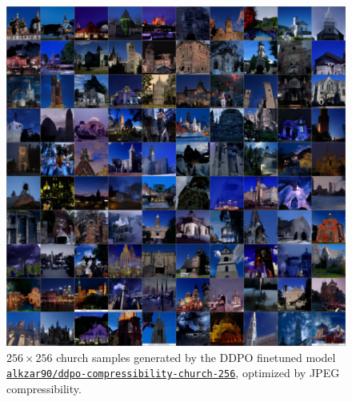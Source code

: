 \begin{appendixs}
        \begin{figure}
            \centering
            \includegraphics[scale=0.8]{img/results/ddpo-church-compressibility-samples.png}
            \vspace{-4pt}  %
            \captionsetup{width=\textwidth} %
            \caption{$256\times256$ church samples generated by the DDPO finetuned model \href{https://huggingface.co/alkzar90/ddpo-compressibility-church-256}{\texttt{\texttt{alkzar90/ddpo-compressibility-church-256}}}, optimized by JPEG compressibility.}
            \label{fig:ddpo-church-compressibility-samples}
        \end{figure}


\end{appendixs}
